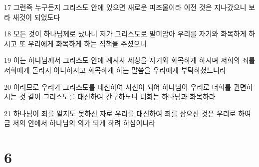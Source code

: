 \par 17 그런즉 누구든지 그리스도 안에 있으면 새로운 피조물이라 이전 것은 지나갔으니 보라 새것이 되었도다
\par 18 모든 것이 하나님께로 났나니 저가 그리스도로 말미암아 우리를 자기와 화목하게 하시고 또 우리에게 화목하게 하는 직책을 주셨으니
\par 19 이는 하나님께서 그리스도 안에 계시사 세상을 자기와 화목하게 하시며 저희의 죄를 저희에게 돌리지 아니하시고 화목하게 하는 말씀을 우리에게 부탁하셨느니라
\par 20 이러므로 우리가 그리스도를 대신하여 사신이 되어 하나님이 우리로 너희를 권면하시는 것 같이 그리스도를 대신하여 간구하노니 너희는 하나님과 화목하라
\par 21 하나님이 죄를 알지도 못하신 자로 우리를 대신하여 죄를 삼으신 것은 우리로 하여금 저의 안에서 하나님의 의가 되게 하려 하심이니라

\chapter{6}

